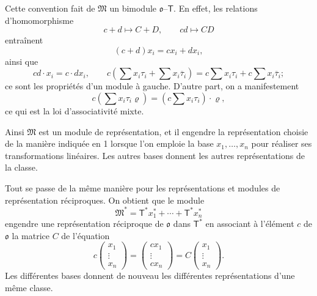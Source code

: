 Cette convention fait de $\mathfrak M$ un bimodule $\mathfrak{o}$--$\mathsf T$. En effet, les relations d'homomorphisme
\[
c+d\mapsto C+D,\qquad cd\mapsto CD
\]
entraînent
\[
(c+d)x_i=cx_i+dx_i,
\]
ainsi que
\[
cd\cdot x_i=c\cdot dx_i,
\qquad
c\left(\sum x_i\tau_i+\sum x_i\overline{\tau}_i\right)
=c\sum x_i\tau_i+c\sum x_i\overline{\tau}_i;
\]
ce sont les propriétés d'un module à gauche. D'autre part, on a manifestement
\[
c\left(\sum x_i\tau_i\varrho\right)
=\left(c\sum x_i\tau_i\right)\cdot\varrho,
\]
ce qui est la loi d'associativité mixte.

Ainsi $\mathfrak M$ est un module de représentation, et il engendre la représentation choisie de la manière indiquée en 1 lorsque l'on emploie la base $x_1,\ldots,x_n$ pour réaliser ses transformations linéaires. Les autres bases donnent les autres représentations de la classe.

Tout se passe de la même manière pour les représentations et modules de représentation réciproques. On obtient que le module
\[
\mathfrak M^*=\mathsf T^*x_1^*+\cdots+\mathsf T^*x_n^*
\]
engendre une représentation réciproque de $\mathfrak{o}$ dans $\mathsf T^*$ en associant à l'élément $c$ de $\mathfrak{o}$ la matrice $C$ de l'équation
\[
c\begin{pmatrix}x_1\\ \vdots\\ x_n\end{pmatrix}
=\begin{pmatrix}cx_1\\ \vdots\\ cx_n\end{pmatrix}
=C\begin{pmatrix}x_1\\ \vdots\\ x_n\end{pmatrix}.
\]
Les différentes bases donnent de nouveau les différentes représentations d'une même classe.
